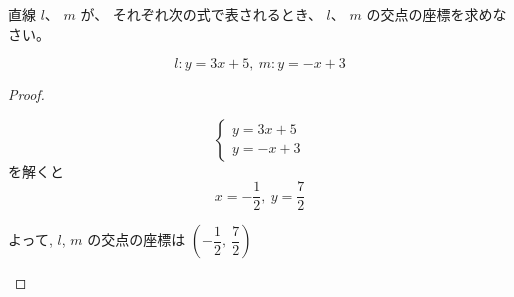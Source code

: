 \vspace{-2em}
\begin{example}
    直線 $l$、 $m$ が、 それぞれ次の式で表されるとき、 $l$、 $m$ の交点の座標を求めなさい。

        \[l: y = 3x + 5,\ m: y = -x + 3\]
\end{example}

\vspace{-2em}
\begin{proof}\mbox{}\\
    \begin{hiddenanswer}
        \[
        \begin{cases}
            y = 3x + 5 \\
            y = -x + 3
        \end{cases}
        \]
        を解くと
        \[x = -\dfrac{1}{2},\ y = \dfrac{7}{2}\]

        よって, $l$, $m$ の交点の座標は $\left(-\dfrac{1}{2},\ \dfrac{7}{2}\right)$
    \end{hiddenanswer}
\end{proof}
\newpage

